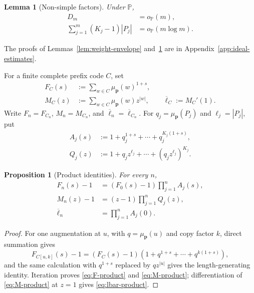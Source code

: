 \documentclass[journal]{IEEEtran}
\theoremstyle{plain}
\newtheorem{lemma}[theorem]{Lemma}
\newtheorem{proposition}[theorem]{Proposition}
\theoremstyle{definition}
\theoremstyle{remark}
\newcommand{\Pideal}{\mathbb P}
\newcommand{\muP}{\mu_{\mathbf p}}
\newcommand{\lbar}{\overline\ell}
\begin{document}
\begin{lemma}[Non-simple factors]\label{lem:nonsimple}
Under $\Pideal$,
\begin{align}
 D_m&=o_{\Pideal}(m),\label{eq:complexity-excess}\\
 \sum_{j=1}^m(K_j-1)|P_j|&=o_{\Pideal}(m\log m).\label{eq:length-excess}
\end{align}
\end{lemma}

The proofs of Lemmas~\ref{lem:weight-envelope} and~\ref{lem:nonsimple} are in Appendix~\ref{app:ideal-estimates}.

For a finite complete prefix code $C$, set
\begin{equation}\label{eq:FM-def}
\begin{aligned}
 F_C(s)&:=\sum_{w\in C}\muP(w)^{1+s},\\
 M_C(z)&:=\sum_{w\in C}\muP(w)z^{|w|},\qquad
 \lbar_C:=M_C'(1).
\end{aligned}
\end{equation}
Write $F_n=F_{C_n}$, $M_n=M_{C_n}$, and $\lbar_n=\lbar_{C_n}$.  For $q_j=\muP(P_j)$ and $\ell_j=|P_j|$, put
\begin{align}
 A_j(s)&:=1+q_j^{1+s}+\cdots+q_j^{K_j(1+s)},\label{eq:A-def}\\
 Q_j(z)&:=1+q_jz^{\ell_j}+\cdots+(q_jz^{\ell_j})^{K_j}.\label{eq:Q-step-def}
\end{align}

\begin{proposition}[Product identities]\label{prop:product-identities}
For every $n$,
\begin{align}
 F_n(s)-1&=(F_0(s)-1)\prod_{j=1}^nA_j(s),\label{eq:F-product}\\
 M_n(z)-1&=(z-1)\prod_{j=1}^nQ_j(z),\label{eq:M-product}\\
 \lbar_n&=\prod_{j=1}^nA_j(0).\label{eq:lbar-product}
\end{align}
\end{proposition}

\begin{proof}
For one augmentation at $u$, with $q=\muP(u)$ and copy factor $k$, direct summation gives
\begin{equation*}
 F_{C[u,k]}(s)-1=(F_C(s)-1)(1+q^{1+s}+\cdots+q^{k(1+s)}),
\end{equation*}
and the same calculation with $q^{1+s}$ replaced by $qz^{|u|}$ gives the length-generating identity.  Iteration proves \eqref{eq:F-product} and \eqref{eq:M-product}; differentiation of \eqref{eq:M-product} at $z=1$ gives \eqref{eq:lbar-product}.
\end{proof}
\end{document}
